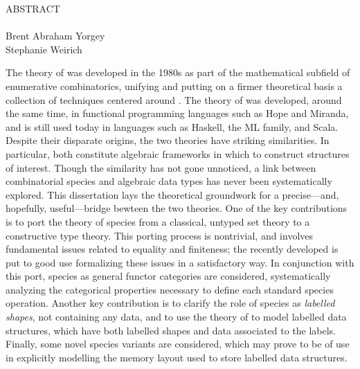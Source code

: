 
\begin{doublespace}

\begin{centering}
{\Large ABSTRACT} \\
\Title \\
Brent Abraham Yorgey \\
Stephanie Weirich \\
\end{centering}

\vspace*{1in}

The theory of  was developed in the 1980s
as part of the mathematical subfield of enumerative combinatorics,
unifying and putting on a firmer theoretical basis a collection of
techniques centered around .  The theory of
 was developed, around the same time, in
functional programming languages such as Hope and Miranda, and is
still used today in languages such as Haskell, the ML family, and
Scala.  Despite their disparate origins, the two theories have striking
similarities. In particular, both constitute algebraic frameworks in
which to construct structures of interest.  Though the similarity has
not gone unnoticed, a link between combinatorial species and algebraic
data types has never been systematically explored.  This dissertation
lays the theoretical groundwork for a precise---and, hopefully,
useful---bridge bewteen the two theories.  One of the key
contributions is to port the theory of species from a classical,
untyped set theory to a constructive type theory. This porting process
is nontrivial, and involves fundamental issues related to equality and
finiteness; the recently developed  is put
to good use formalizing these issues in a satisfactory way.  In
conjunction with this port, species as general functor categories are
considered, systematically analyzing the categorical properties
necessary to define each standard species operation.  Another key
contribution is to clarify the role of species as \emph{labelled
  shapes}, not containing any data, and to use the theory of
 to model labelled data structures, which have
both labelled shapes and data associated to the labels.  Finally, some
novel species variants are considered, which may prove to be of use in
explicitly modelling the memory layout used to store labelled data
structures.

\end{doublespace}
